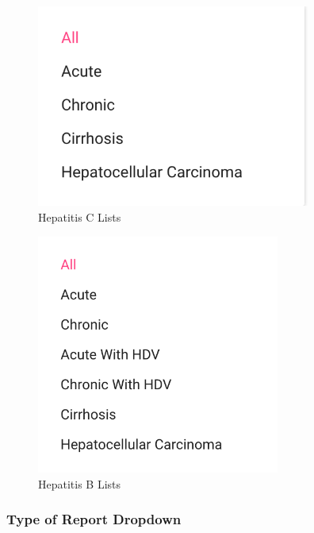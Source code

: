     \FloatBarrier
        \begin{figure}[h!]
            \centering
        		\includegraphics[width=9cm]{images/chapter-06/disease-hepatitis-c-lists.png}
            	\caption{Hepatitis C Lists}
        		\label{figure-disease-hepatitis-c-lists}
        \end{figure}
    \FloatBarrier
    
    \FloatBarrier
        \begin{figure}[h!]
            \centering
        		\includegraphics[width=8cm]{images/chapter-06/disease-hepatitis-d-lists.png}
            	\caption{Hepatitis B Lists}
        		\label{figure-disease-hepatitis-d-lists}
        \end{figure}
    \FloatBarrier


\subsubsection{Type of Report Dropdown}


    
    
